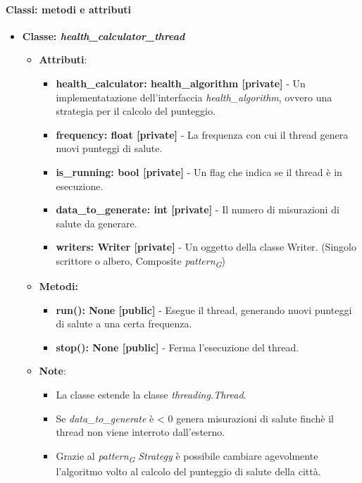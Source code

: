 \paragraph*{Classi: metodi e attributi}
\begin{itemize}
    \item{\textbf{Classe: \textit{health\_calculator\_thread}}}
    \begin{itemize}
    \item\textbf{Attributi}:
        \begin{itemize}
        \item \textbf{health\_calculator: health\_algorithm [private]} - Un implementatazione dell'interfaccia \textit{health\_algorithm}, ovvero una strategia per il calcolo del punteggio.
        \item \textbf{frequency: float [private]} - La frequenza con cui il thread genera nuovi punteggi di salute.
        \item \textbf{is\_running: bool [private]} - Un flag che indica se il thread è in esecuzione.
        \item \textbf{data\_to\_generate: int [private]} - Il numero di misurazioni di salute da generare.
        \item \textbf{writers: Writer [private]} - Un oggetto della classe Writer. (Singolo scrittore o albero, Composite \textit{pattern}\textsubscript{\textit{G}})
    \end{itemize}
    \item \textbf{Metodi: }
    \begin{itemize}
        \item \textbf{run(): None [public]} - Esegue il thread, generando nuovi punteggi di salute a una certa frequenza.
        \item \textbf{stop(): None [public]} - Ferma l'esecuzione del thread.
    \end{itemize}
    \item\textbf{Note}:
        \begin{itemize}
            \item La classe estende la classe \textit{threading.Thread}.
            \item Se \textit{data\_to\_generate} è < 0 genera misurazioni di salute finchè il thread non viene interroto dall'esterno.
            \item   Grazie al \textit{pattern}\textsubscript{\textit{G}} \textit{Strategy} è possibile cambiare agevolmente l'algoritmo volto al calcolo del punteggio di salute della città.
        \end{itemize}
    \end{itemize}
\end{itemize}

